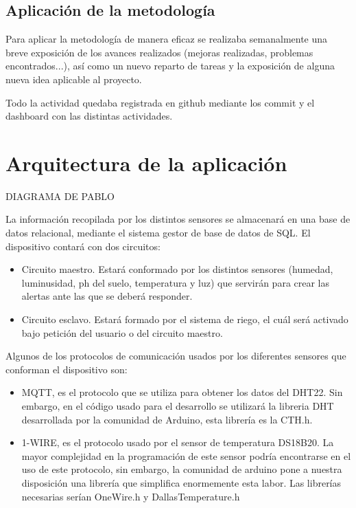 \documentclass[runningheads]{llncs}
\begin{document}
\subsection{Aplicación de la metodología}
Para aplicar la metodología de manera eficaz se realizaba semanalmente
una breve exposición de los avances realizados (mejoras realizadas,
problemas encontrados...), así como un nuevo reparto de tareas y la
exposición de alguna nueva idea aplicable al proyecto.

Todo la actividad quedaba registrada en github mediante los commit y el
dashboard con las distintas actividades.

\section{Arquitectura de la aplicación}
DIAGRAMA DE PABLO 

La información recopilada por los distintos sensores se almacenará en una base de datos relacional, mediante el sistema gestor de base de datos de SQL.  El dispositivo contará con dos circuitos:
\begin{itemize}
\item Circuito maestro. Estará conformado por los distintos sensores (humedad, luminusidad, ph del suelo, temperatura y luz) que servirán para crear las alertas ante las que se deberá responder.
\item Circuito esclavo. Estará formado por el sistema de riego, el cuál será activado bajo petición del usuario o del circuito maestro.
\end{itemize}


Algunos de los protocolos de comunicación usados por los diferentes sensores que conforman el dispositivo son:
\begin{itemize}
\item MQTT, es el protocolo que se utiliza para obtener los datos del DHT22. Sin embargo, en el código usado para el desarrollo se utilizará la libreria DHT desarrollada por la comunidad de Arduino, esta librería es la CTH.h.
\item 1-WIRE, es el protocolo usado por el sensor de temperatura DS18B20. La mayor complejidad en la programación de este sensor podría encontrarse en el uso de este protocolo, sin embargo, la comunidad de arduino pone a nuestra disposición una librería que simplifica enormemente esta labor. Las librerías necesarias serían OneWire.h y DallasTemperature.h
\end{itemize}
\end{document}
